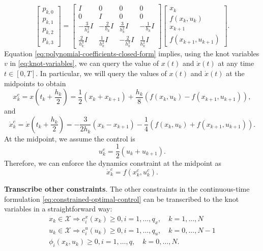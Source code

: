 \documentclass[
]{book}
\theoremstyle{definition}
\theoremstyle{definition}
\theoremstyle{definition}
\theoremstyle{definition}
\theoremstyle{remark}
\begin{document}
\begin{equation}
\begin{bmatrix}
p_{k,0}\\
p_{k,1}\\
p_{k,2}\\
p_{k,3}
\end{bmatrix} = 
\begin{bmatrix}
I & 0 & 0 & 0 \\
0 & I & 0 & 0 \\
- \frac{3}{h_k^2} I & - \frac{2}{h_k} I & \frac{3}{h_k^2} I & -\frac{1}{h_k} I \\
\frac{2}{h_k^3} I & \frac{1}{h_k^2} I & -\frac{2}{h_k^3} I & \frac{1}{h_k^2} I 
\end{bmatrix}
\begin{bmatrix}
x_k \\
f(x_k,u_k) \\
x_{k+1} \\
f(x_{k+1}, u_{k+1})
\end{bmatrix}.
\label{eq:polynomial-coefficients-closed-form}
\end{equation}
Equation \eqref{eq:polynomial-coefficients-closed-form} implies, using the knot variables \(v\) in \eqref{eq:knot-variables}, we can query the value of \(x(t)\) and \(\dot{x}(t)\) at any time \(t \in [0,T]\). In particular, we will query the values of \(x(t)\) and \(\dot{x}(t)\) at the midpoints to obtain
\[
x_k^c = x\left( t_k + \frac{h_k}{2} \right) = \frac{1}{2} (x_k + x_{k+1}) + \frac{h_k}{8} (f(x_k,u_k) - f(x_{k+1},u_{k+1})),
\]
and
\[
\dot{x}_k^c = \dot{x} \left( t_k + \frac{h_k}{2} \right) = - \frac{3}{2h_k} (x_k - x_{k+1}) - \frac{1}{4} \left( f(x_k,u_k) + f(x_{k+1},u_{k+1}) \right).
\]
At the midpoint, we assume the control is
\[
u_k^c = \frac{1}{2}(u_k + u_{k+1}).
\]
Therefore, we can enforce the dynamics constraint at the midpoint as
\begin{equation}
\dot{x}^c_k = f(x_k^c, u_k^c).
\label{eq:collocation-constraint}
\end{equation}

\textbf{Transcribe other constraints}. The other constraints in the continuous-time formulation \eqref{eq:constrained-optimal-control} can be transcribed to the knot variables in a straightforward way:
\begin{align}
x_k \in \mathcal{X} \Rightarrow c_i^x(x_k)\geq 0, i=1,\dots,q_x, \quad k=1,\dots,N \\
u_k \in \mathcal{X} \Rightarrow c^u_i(u_k) \geq 0, i=1,\dots,q_u, \quad k=0,\dots,N-1\\
\phi_i(x_k, u_k) \geq 0, i=1,\dots,q, \quad k=0,\dots,N.
\end{align}
\end{document}
